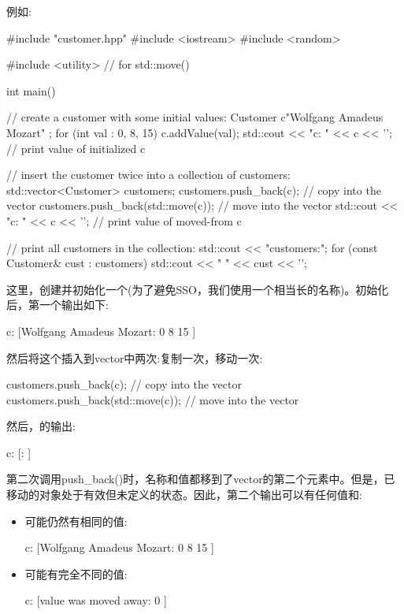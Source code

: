 例如:

\begin{cppcode}
#include "customer.hpp"
#include <iostream>
#include <random>

#include <utility> // for std::move()

int main()
{
	// create a customer with some initial values:
	Customer c{"Wolfgang Amadeus Mozart" };
	for (int val : {0, 8, 15}) {
		c.addValue(val);
	}
	std::cout << "c: " << c << '\n'; // print value of initialized c

	// insert the customer twice into a collection of customers:
	std::vector<Customer> customers;
	customers.push_back(c); // copy into the vector
	customers.push_back(std::move(c)); // move into the vector
	std::cout << "c: " << c << '\n'; // print value of moved-from c

	// print all customers in the collection:
	std::cout << "customers:\n";
	for (const Customer& cust : customers) {
		std::cout << " " << cust << '\n';
	}
}
\end{cppcode}

这里，创建并初始化一个(为了避免SSO，我们使用一个相当长的名称)。初始化后，第一个输出如下:

\begin{outputcode}
c: [Wolfgang Amadeus Mozart: 0 8 15 ]
\end{outputcode}

然后将这个插入到vector中两次:复制一次，移动一次:

\begin{cppcode}
customers.push_back(c); // copy into the vector
customers.push_back(std::move(c)); // move into the vector
\end{cppcode}

然后，的输出:

\begin{outputcode}
c: [: ]
\end{outputcode}

第二次调用push_back()时，名称和值都移到了vector的第二个元素中。但是，已移动的对象处于有效但未定义的状态。因此，第二个输出可以有任何值和:

\begin{itemize}
	\item 可能仍然有相同的值:

	\begin{outputcode}
c: [Wolfgang Amadeus Mozart: 0 8 15 ]
	\end{outputcode}
	\item 可能有完全不同的值:

	\begin{outputcode}
c: [value was moved away: 0 ]
	\end{outputcode}
\end{itemize}

